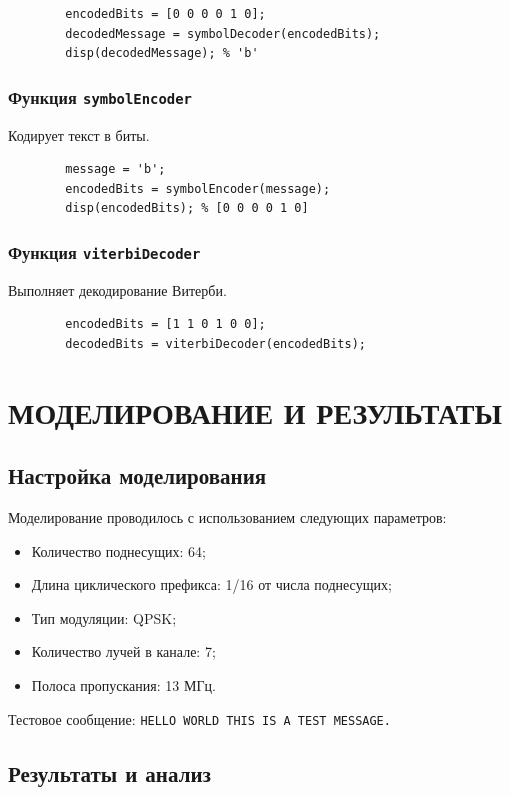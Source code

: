 \documentclass[a4paper,14pt,oneside,openany]{memoir}
\begin{document}
	\begin{lstlisting}
		encodedBits = [0 0 0 0 1 0];
		decodedMessage = symbolDecoder(encodedBits);
		disp(decodedMessage); % 'b'
	\end{lstlisting}
	
	\subsection{Функция \texttt{symbolEncoder}}
	Кодирует текст в биты.
	
	\begin{lstlisting}
		message = 'b';
		encodedBits = symbolEncoder(message);
		disp(encodedBits); % [0 0 0 0 1 0]
	\end{lstlisting}
	
	\subsection{Функция \texttt{viterbiDecoder}}
	Выполняет декодирование Витерби.
	
	\begin{lstlisting}
		encodedBits = [1 1 0 1 0 0];
		decodedBits = viterbiDecoder(encodedBits);
	\end{lstlisting}
	
	\chapter{МОДЕЛИРОВАНИЕ И РЕЗУЛЬТАТЫ}
	
	\section{Настройка моделирования}
	
	Моделирование проводилось с использованием следующих параметров:
	\begin{itemize}
		\item Количество поднесущих: 64;
		\item Длина циклического префикса: 1/16 от числа поднесущих;
		\item Тип модуляции: QPSK;
		\item Количество лучей в канале: 7;
		\item Полоса пропускания: 13 МГц.
	\end{itemize}
	
	Тестовое сообщение: \texttt{\mbox{HELLO WORLD THIS IS A TEST MESSAGE.}}
	
	\section{Результаты и анализ}
	
\end{document}
